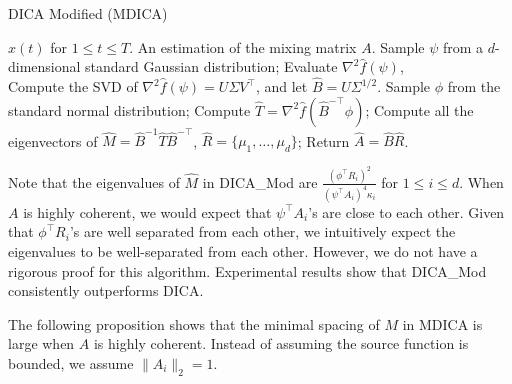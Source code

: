 \documentclass[twoside,11pt]{article}
\begin{document}
\begin{algorithm} 
\caption{DICA Modified (MDICA)}
\label{alg:DICA_Mod}
\begin{algorithmic}[1]
\INPUT $x(t)$ for $1\le t \le T$. 
\OUTPUT An estimation of the mixing matrix $A$. 
\STATE Sample $\psi$ from a $d$-dimensional standard Gaussian distribution;
\STATE Evaluate $\nabla^2\hat{f}(\psi)$, \\
\STATE Compute the SVD of $\nabla^2\hat{f}(\psi) = U \Sigma V^{\top}$, and let $\hat{B} =  U \Sigma^{1/2}$.
\STATE Sample $\phi$ from the standard normal distribution;
\STATE Compute $\hat{T} = \nabla^2 \hat{f}(\hat{B}^{-\top}\phi)$;
\STATE Compute all the eigenvectors of $\hat{M} = \hat{B}^{-1}\hat{T}\hat{B}^{-\top}$, $\hat{R} = \{\mu_1,\ldots,\mu_d\}$;
\STATE Return $\hat{A} = \hat{B}\hat{R}$.
\end{algorithmic}
\end{algorithm}
\begin{remark}
\label{rmk:DICA_Mod}
Note that the eigenvalues of $\hat{M}$ in DICA\_Mod are $\frac{(\phi^{\top}R_i)^2}{(\psi^{\top}A_i)^4\kappa_i}$ for $1\le i\le d$. 
When $A$ is highly coherent, we would expect that $\psi^{\top}A_i$'s are close to each other. 
Given that $\phi^{\top}R_i$'s are well separated from each other, we intuitively expect the eigenvalues to be well-separated from each other. 
However, we do not have a rigorous proof for this algorithm.
Experimental results show that DICA\_Mod consistently outperforms DICA. 

\end{remark}
The following proposition shows that the minimal spacing of $M$ in MDICA is large when $A$ is highly coherent. Instead of assuming the source function is bounded, we assume $\|A_i\|_2 = 1$.
\end{document}
